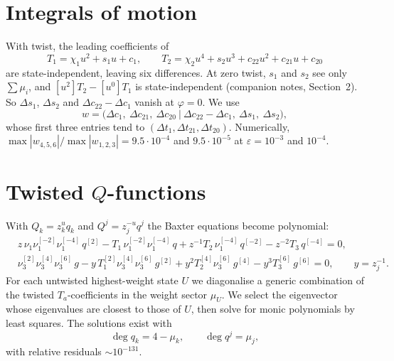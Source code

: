 \documentclass[11pt]{article}
\newcommand{\sh}[1]{^{[#1]}}
\begin{document}
\section{Integrals of motion}

With twist, the leading coefficients of
\begin{equation}
T_1=\chi_1u^2+s_1u+c_1,\qquad T_2=\chi_2u^4+s_2u^3+c_{22}u^2+c_{21}u+c_{20}
\end{equation}
are state-independent, leaving six differences. At zero twist, $s_1$ and $s_2$ see only
$\sum\mu_i$, and $[u^2]T_2-[u^0]T_1$ is state-independent (companion notes, Section~2). So
$\Delta s_1$, $\Delta s_2$ and $\Delta c_{22}-\Delta c_1$ vanish at $\varphi=0$. We use
\begin{equation}
w=\big(\Delta c_1,\ \Delta c_{21},\ \Delta c_{20}\ \big|\ \Delta c_{22}-\Delta c_1,\ \Delta s_1,\ \Delta s_2\big),
\end{equation}
whose first three entries tend to $(\Delta t_1,\Delta t_{21},\Delta t_{20})$. Numerically,
$\max|w_{4,5,6}|/\max|w_{1,2,3}|=9.5\cdot10^{-4}$ and $9.5\cdot10^{-5}$ at
$\varepsilon=10^{-3}$ and $10^{-4}$.

\section{Twisted $Q$-functions}

With $Q_k=z_k^{u}q_k$ and $Q^j=z_j^{-u}q^j$ the Baxter equations become polynomial:
\begin{align}
&z\,\nu_1\nu_1\sh{-2}\nu_1\sh{-4}\,q\sh{2}-T_1\,\nu_1\sh{-2}\nu_1\sh{-4}\,q+z^{-1}T_2\,\nu_1\sh{-4}\,q\sh{-2}-z^{-2}T_3\,q\sh{-4}=0,\\
&\nu_3\sh{2}\nu_3\sh{4}\nu_3\sh{6}\,g-y\,T_1\sh{2}\nu_3\sh{4}\nu_3\sh{6}\,g\sh{2}+y^2T_2\sh{4}\nu_3\sh{6}\,g\sh{4}-y^3T_3\sh{6}\,g\sh{6}=0,\qquad y=z_j^{-1}.
\end{align}
For each untwisted highest-weight state $U$ we diagonalise a generic combination of the twisted
$T_a$-coefficients in the weight sector $\mu_U$. We select the eigenvector whose eigenvalues are
closest to those of $U$, then solve for monic polynomials by least squares. The solutions exist
with
\begin{equation}
\deg q_k=4-\mu_k,\qquad \deg q^j=\mu_j,
\end{equation}
with relative residuals $\sim10^{-131}$.
\end{document}
